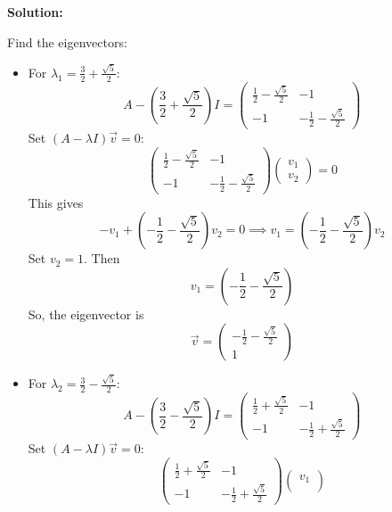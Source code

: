 \documentclass[12pt]{article}
\newenvironment{solution}{
    \textbf{Solution:}
    
}{
    
    \vspace{2em}
}
\begin{document}
\begin{solution}
    Find the eigenvectors:
    \begin{itemize}
        \item For \(\lambda_1 = \frac{3}{2} + \frac{\sqrt{5}}{2}\):
        \[
            A - \left(\frac{3}{2} + \frac{\sqrt{5}}{2}\right)I = \begin{pmatrix}
                \frac{1}{2} - \frac{\sqrt{5}}{2} & -1 \\
                -1 & -\frac{1}{2} - \frac{\sqrt{5}}{2}
            \end{pmatrix}
        \]
        Set  \((A - \lambda I)\vec{v} = 0\):
        \[
        \begin{pmatrix}
            \frac{1}{2} - \frac{\sqrt{5}}{2} & -1 \\
            -1 & -\frac{1}{2} - \frac{\sqrt{5}}{2}
        \end{pmatrix}
        \begin{pmatrix}
            v_1 \\
            v_2
        \end{pmatrix} = 0
        \]
        This gives
        \[
            -v_1 + \left(-\frac{1}{2} - \frac{\sqrt{5}}{2}\right)v_2 = 0 \implies v_1 = \left(-\frac{1}{2} - \frac{\sqrt{5}}{2}\right)v_2
        \]
        Set \(v_2 = 1\). Then
        \[
            v_1 = \left(-\frac{1}{2} - \frac{\sqrt{5}}{2}\right)
        \]
        So, the eigenvector is
        \[
            \vec{v} = \begin{pmatrix}
                -\frac{1}{2} - \frac{\sqrt{5}}{2} \\
                1
            \end{pmatrix}
        \]
        \item For \(\lambda_2 = \frac{3}{2} - \frac{\sqrt{5}}{2}\):
        \[
            A - \left(\frac{3}{2} - \frac{\sqrt{5}}{2}\right)I = \begin{pmatrix}
                \frac{1}{2} + \frac{\sqrt{5}}{2} & -1 \\
                -1 & -\frac{1}{2} + \frac{\sqrt{5}}{2}
            \end{pmatrix}
        \]
        Set \((A - \lambda I)\vec{v} = 0\):
        \[
        \begin{pmatrix}
            \frac{1}{2} + \frac{\sqrt{5}}{2} & -1 \\
            -1 & -\frac{1}{2} + \frac{\sqrt{5}}{2}
        \end{pmatrix}
        \begin{pmatrix}
            v_1 \\

\end{pmatrix}\]
\end{itemize}
\end{solution}
\end{document}
